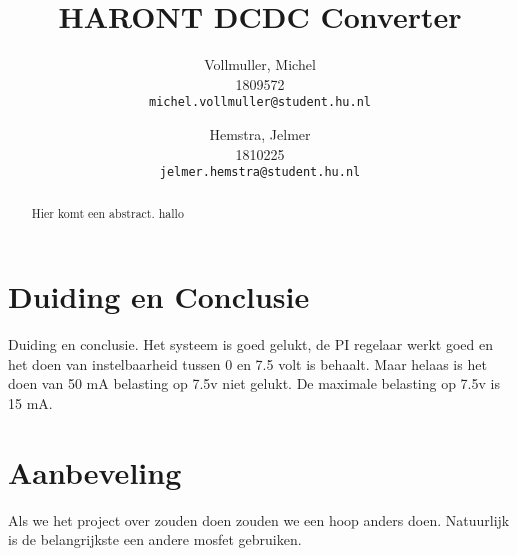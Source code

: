 \documentclass{article}
\title{HARONT DCDC Converter}
\author{
  Vollmuller, Michel\\
  1809572\\
  \texttt{michel.vollmuller@student.hu.nl}
  \and
  Hemstra, Jelmer\\
  1810225\\
  \texttt{jelmer.hemstra@student.hu.nl}
}
\begin{document}
\maketitle

\begin{abstract}
    Hier komt een abstract. hallo
\end{abstract}










\section{Duiding en Conclusie}
Duiding en conclusie.
Het systeem is goed gelukt, de PI regelaar werkt goed en het doen van instelbaarheid tussen 0 en 7.5 volt is behaalt. 
Maar helaas is het doen van 50 mA belasting op 7.5v niet gelukt. 
De maximale belasting op 7.5v is 15 mA. 

\section{Aanbeveling}
Als we het project over zouden doen zouden we een hoop anders doen. 
Natuurlijk is de belangrijkste een andere mosfet gebruiken. 



\appendix
\end{document}

